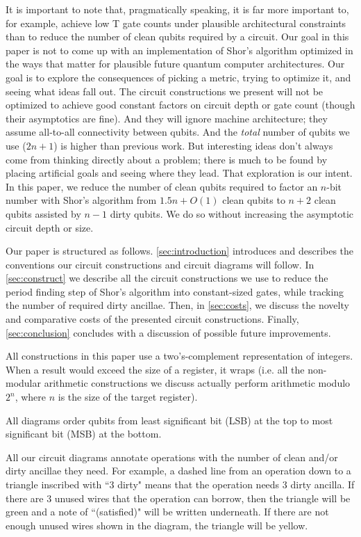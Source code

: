 \documentclass[twocolumn,longbibliography]{quantumarticle-customized}
\begin{document}
It is important to note that, pragmatically speaking, it is far more important to, for example, achieve low T gate counts under plausible architectural constraints than to reduce the number of clean qubits required by a circuit.
Our goal in this paper is not to come up with an implementation of Shor's algorithm optimized in the ways that matter for plausible future quantum computer architectures.
Our goal is to explore the consequences of picking a metric, trying to optimize it, and seeing what ideas fall out.
The circuit constructions we present will not be optimized to achieve good constant factors on circuit depth or gate count (though their asymptotics are fine).
And they will ignore machine architecture; they assume all-to-all connectivity between qubits.
And the {\em total} number of qubits we use ($2n+1$) is higher than previous work.
But interesting ideas don't always come from thinking directly about a problem; there is much to be found by placing artificial goals and seeing where they lead.
That exploration is our intent.
In this paper, we reduce the number of clean qubits required to factor an $n$-bit number with Shor's algorithm from $1.5n + O(1)$ clean qubits \cite{zalka2006} to $n+2$ clean qubits assisted by $n-1$ dirty qubits.
We do so without increasing the asymptotic circuit depth or size.

Our paper is structured as follows.
\autoref{sec:introduction} introduces and describes the conventions our circuit constructions and circuit diagrams will follow.
In \autoref{sec:construct} we describe all the circuit constructions we use to reduce the period finding step of Shor's algorithm into constant-sized gates, while tracking the number of required dirty ancillae.
Then, in \autoref{sec:costs}, we discuss the novelty and comparative costs of the presented circuit constructions.
Finally, \autoref{sec:conclusion} concludes with a discussion of possible future improvements.

All constructions in this paper use a two's-complement representation of integers.
When a result would exceed the size of a register, it wraps (i.e. all the non-modular arithmetic constructions we discuss actually perform arithmetic modulo $2^n$, where $n$ is the size of the target register).

All diagrams order qubits from least significant bit (LSB) at the top to most significant bit (MSB) at the bottom.

All our circuit diagrams annotate operations with the number of clean and/or dirty ancillae they need.
For example, a dashed line from an operation down to a triangle inscribed with ``3 dirty" means that the operation needs 3 dirty ancilla.
If there are 3 unused wires that the operation can borrow, then the triangle will be green and a note of ``(satisfied)" will be written underneath.
If there are not enough unused wires shown in the diagram, the triangle will be yellow.
\end{document}
